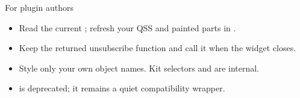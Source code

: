\begin{standardframe}{For plugin authors}
\begin{itemize}
\item Read the current ; refresh your QSS and painted parts in .
\item Keep the returned unsubscribe function and call it when the widget closes.
\item Style only your own object names. Kit selectors and  are internal.
\item {} is deprecated; it remains a quiet compatibility wrapper.
\end{itemize}
\end{standardframe}

